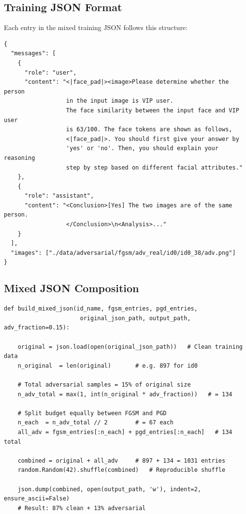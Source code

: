 \documentclass[12pt,a4paper]{article}
\begin{document}
\subsection{Training JSON Format}

Each entry in the mixed training JSON follows this structure:

\begin{lstlisting}[language={},caption={Training JSON entry format}]
{
  "messages": [
    {
      "role": "user",
      "content": "<|face_pad|><image>Please determine whether the person
                  in the input image is VIP user.
                  The face similarity between the input face and VIP user
                  is 63/100. The face tokens are shown as follows,
                  <|face_pad|>. You should first give your answer by
                  'yes' or 'no'. Then, you should explain your reasoning
                  step by step based on different facial attributes."
    },
    {
      "role": "assistant",
      "content": "<Conclusion>[Yes] The two images are of the same person.
                  </Conclusion>\n<Analysis>..."
    }
  ],
  "images": ["./data/adversarial/fgsm/adv_real/id0/id0_38/adv.png"]
}
\end{lstlisting}

\subsection{Mixed JSON Composition}

\begin{lstlisting}[caption={Building the mixed training dataset}]
def build_mixed_json(id_name, fgsm_entries, pgd_entries,
                      original_json_path, output_path, adv_fraction=0.15):

    original = json.load(open(original_json_path))   # Clean training data
    n_original  = len(original)       # e.g. 897 for id0

    # Total adversarial samples = 15% of original size
    n_adv_total = max(1, int(n_original * adv_fraction))   # = 134

    # Split budget equally between FGSM and PGD
    n_each  = n_adv_total // 2        # = 67 each
    all_adv = fgsm_entries[:n_each] + pgd_entries[:n_each]   # 134 total

    combined = original + all_adv     # 897 + 134 = 1031 entries
    random.Random(42).shuffle(combined)   # Reproducible shuffle

    json.dump(combined, open(output_path, 'w'), indent=2, ensure_ascii=False)
    # Result: 87% clean + 13% adversarial
\end{lstlisting}
\end{document}
